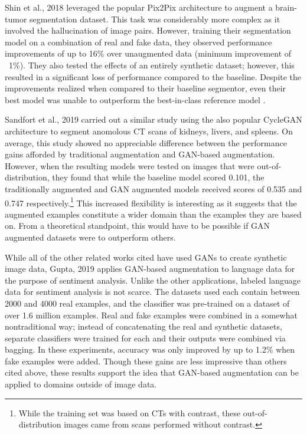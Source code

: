\documentclass{article}
\begin{document}
      Shin et al., 2018 \cite{shin} leveraged the popular Pix2Pix \cite{pix2pix} architecture to augment a brain-tumor segmentation dataset. This task was considerably more complex as it involved the hallucination of image pairs. However, training their segmentation model on a combination of real and fake data, they observed performance improvements of up to 16\% over unaugmented data (minimum improvement of ~1\%). They also tested the effects of an entirely synthetic dataset; however, this resulted in a significant loss of performance compared to the baseline. Despite the improvements realized when compared to their baseline segmentor, even their best model was unable to outperform the best-in-class reference model \cite{wang}.

      Sandfort et al., 2019 \cite{sandfort} carried out a similar study using the also popular CycleGAN architecture \cite{cyclegan} to segment anomolous CT scans of kidneys, livers, and spleens. On average, this study showed no appreciable difference between the performance gains afforded by traditional augmentation and GAN-based augmentation. However, when the resulting models were tested on images that were out-of-distribution, they found that while the baseline model scored 0.101, the traditionally augmented and GAN augmented models received scores of 0.535 and 0.747 respectively.\footnote{While the training set was based on CTs with contrast, these out-of-distribution images came from scans performed without contrast.} This increased flexibility is interesting as it suggests that the augmented examples constitute a wider domain than the examples they are based on. From a theoretical standpoint, this would have to be possible if GAN augmented datasets were to outperform others.

      While all of the other related works cited have used GANs to create synthetic image data, Gupta, 2019 \cite{gupta} applies GAN-based augmentation to language data for the purpose of sentiment analysis. Unlike the other applications, labeled language data for sentiment analysis is not scarce. The datasets used each contain between 2000 and 4000 real examples, and the classifier was pre-trained on a dataset of over 1.6 million examples. Real and fake examples were combined in a somewhat nontraditional way; instead of concatenating the real and synthetic datasets, separate classifiers were trained for each and their outputs were combined via bagging. In these experiments, accuracy was only improved by up to 1.2\% when fake examples were added. Though these gains are less impressive than others cited above, these results support the idea that GAN-based augmentation can be applied to domains outside of image data.
  
\end{document}
